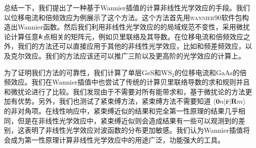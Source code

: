 总结一下，我们提出了一种基于Wannier插值的计算非线性光学效应的手段。我们以位移电流和倍频效应为例展示了这个方法。这个方法首先用\textsc{wannier90}软件包构造出Wannier函数。然后我们利用非线性光学效应的的局域规范不变性，采用微扰论计算任意$\boldsymbol{k}$点相关的矩阵元，例如贝里联络及其导数。在位移电流和倍频效应之外，我们的方法还可以直接应用于其他的非线性光学效应，比如和频差频效应，以及克尔效应。我们的方法应该还可以推广三阶以及更高阶的光学效应的计算上。

为了证明我们方法的可靠性，我们计算了单层GeS和WS$_{2}$的位移电流和GaAs的倍频效应。我们在Wannier插值中也尝试了传统的计算贝里联络导数的求和规则并且和微扰论进行了比较。我们发现由于不需要对所有能带求和，基于微扰论的方法更加有优势。另外，我们也测试了紧束缚方法，紧束缚方法不需要知道 $\langle\mathbf{0}n|\hat{\mathbf{r}}|\mathbf{R}m\rangle$的非对角项。在线性响应中，紧束缚近似的结果和完全第一性原理的结果几乎相同，但是在非线性光学效应中，紧束缚近似则会造成结果有一些可以观测到的差别，这表明了非线性光学效应对波函数的分布更加敏感。我们认为Wannier插值将会成为第一性原理计算非线性光学效应中的用途广泛，功能强大的工具。
